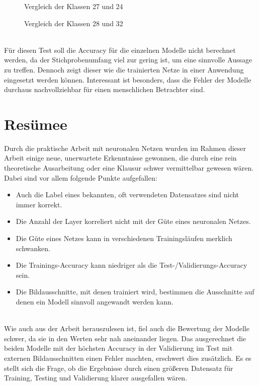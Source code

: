 \begin{figure} [!ht]
	\centering
	\caption{Vergleich der Klassen 27 und 24} \label{pic:27-24}
\end{figure}

\begin{figure} [!ht]
	\centering
	\caption{Vergleich der Klassen 28 und 32} \label{pic:28-32}
\end{figure} \ \\
%
Für diesen Test soll die Accuracy für die einzelnen Modelle nicht berechnet werden, da der Stichprobenumfang viel zur gering ist, um eine sinnvolle Aussage zu treffen. Dennoch zeigt dieser wie die trainierten Netze in einer Anwendung eingesetzt werden können. Interessant ist besonders, dass die Fehler der Modelle durchaus nachvollziehbar für einen menschlichen Betrachter sind. 
\newpage

\section{Resümee}
Durch die praktische Arbeit mit neuronalen Netzen wurden im Rahmen dieser Arbeit einige neue, unerwartete Erkenntnisse gewonnen, die durch eine rein theoretische Ausarbeitung oder eine Klausur schwer vermittelbar gewesen wären. Dabei sind vor allem folgende Punkte aufgefallen:

\begin{itemize}
	\item Auch die Label eines bekannten, oft verwendeten Datensatzes sind nicht immer korrekt.
	\item Die Anzahl der Layer korreliert nicht mit der Güte eines neuronalen Netzes.
	\item Die Güte eines Netzes kann in verschiedenen Trainingsläufen merklich schwanken.
	\item Die Trainings-Accuracy kann niedriger als die Test-/Validierungs-Accuracy sein.
	\item Die Bildausschnitte, mit denen trainiert wird, bestimmen die Ausschnitte auf denen ein Modell sinnvoll angewandt werden kann.
\end{itemize} \ \\
Wie auch aus der Arbeit herauszulesen ist, fiel auch die Bewertung der Modelle schwer, da sie in den Werten sehr nah aneinander liegen. Das ausgerechnet die beiden Modelle mit der höchsten Accuracy in der Validierung im Test mit externen Bildausschnitten einen Fehler machten, erschwert dies zusätzlich. Es es stellt sich die Frage, ob die Ergebnisse durch einen größeren Datensatz für Training, Testing und Validierung klarer ausgefallen wären.
